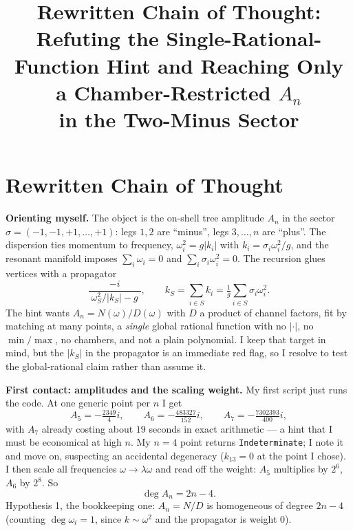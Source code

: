 \documentclass[11pt]{article}
\title{Rewritten Chain of Thought: Refuting the Single-Rational-Function Hint
and Reaching Only a Chamber-Restricted $A_n$\\
in the Two-Minus Sector}
\author{}
\date{}
\begin{document}
\maketitle


\section*{Rewritten Chain of Thought}

\noindent\textbf{Orienting myself.}
The object is the on-shell tree amplitude $A_n$ in the sector
$\sigma=(-1,-1,+1,\dots,+1)$: legs $1,2$ are ``minus'', legs $3,\dots,n$ are ``plus''.
The dispersion ties momentum to frequency, $\omega_i^2 = g|k_i|$ with
$k_i = \sigma_i\omega_i^2/g$, and the resonant manifold imposes $\sum_i\omega_i=0$ and
$\sum_i\sigma_i\omega_i^2=0$. The recursion glues vertices with a propagator
\[
\frac{-i}{\;\omega_S^2/|k_S|-g\;},\qquad
k_S=\sum_{i\in S}k_i=\tfrac1g\sum_{i\in S}\sigma_i\omega_i^2 .
\]
The hint wants $A_n=N(\omega)/D(\omega)$ with $D$ a product of channel factors, fit by
matching at many points, a \emph{single} global rational function with no $|\cdot|$, no
$\min/\max$, no chambers, and not a plain polynomial. I keep that target in mind, but the
$|k_S|$ in the propagator is an immediate red flag, so I resolve to test the global-rational
claim rather than assume it.

\medskip
\noindent\textbf{First contact: amplitudes and the scaling weight.}
My first script just runs the code. At one generic point per $n$ I get
\[
A_5=-\tfrac{2349}{4}i,\qquad A_6=-\tfrac{483327}{152}i,\qquad A_7=-\tfrac{7302393}{400}i,
\]
with $A_7$ already costing about $19$ seconds in exact arithmetic --- a hint that I must be
economical at high $n$. My $n=4$ point returns \texttt{Indeterminate}; I note it and move on,
suspecting an accidental degeneracy ($k_{13}=0$ at the point I chose). I then scale all
frequencies $\omega\to\lambda\omega$ and read off the weight: $A_5$ multiplies by $2^6$,
$A_6$ by $2^8$. So
\[
\deg A_n = 2n-4 .
\]
Hypothesis 1, the bookkeeping one: $A_n=N/D$ is homogeneous of degree $2n-4$ (counting
$\deg\omega_i=1$, since $k\sim\omega^2$ and the propagator is weight $0$).
\end{document}

